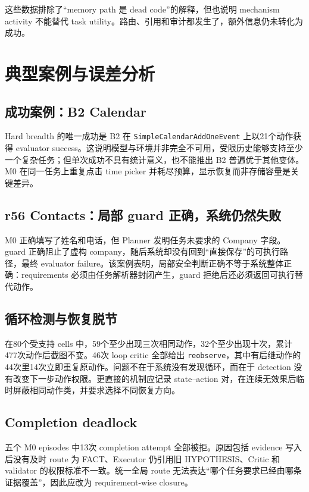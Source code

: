 \documentclass[12pt,a4paper]{ctexart}
\newcommand{\code}[1]{\texttt{#1}}
\begin{document}
这些数据排除了“memory path 是 dead code”的解释，但也说明 mechanism activity 不能替代 task utility。路由、引用和审计都发生了，额外信息仍未转化为成功。

\section{典型案例与误差分析}

\subsection{成功案例：B2 Calendar}

Hard breadth 的唯一成功是 B2 在 \code{SimpleCalendarAddOneEvent} 上以21个动作获得 evaluator success。这说明模型与环境并非完全不可用，受限历史能够支持至少一个复杂任务；但单次成功不具有统计意义，也不能推出 B2 普遍优于其他变体。M0 在同一任务上重复点击 time picker 并耗尽预算，显示恢复而非存储容量是关键差异。

\subsection{r56 Contacts：局部 guard 正确，系统仍然失败}

M0 正确填写了姓名和电话，但 Planner 发明任务未要求的 Company 字段。guard 正确阻止了虚构 company，随后系统却没有回到“直接保存”的可执行路径，最终 evaluator failure。该案例表明，局部安全判断正确不等于系统整体正确：requirements 必须由任务解析器封闭产生，guard 拒绝后还必须返回可执行替代动作。

\subsection{循环检测与恢复脱节}

在80个受支持 cells 中，59个至少出现三次相同动作，32个至少出现十次，累计477次动作后截图不变。46次 loop critic 全部给出 \code{reobserve}，其中有后继动作的44次里14次立即重复原动作。问题不在于系统没有发现循环，而在于 detection 没有改变下一步动作权限。更直接的机制应记录 state--action 对，在连续无效果后临时屏蔽相同动作类，并要求选择不同恢复方向。

\subsection{Completion deadlock}

五个 M0 episodes 中13次 completion attempt 全部被拒。原因包括 evidence 写入后没有及时 route 为 FACT、Executor 仍引用旧 HYPOTHESIS、Critic 和 validator 的权限标准不一致。统一全局 route 无法表达“哪个任务要求已经由哪条证据覆盖”，因此应改为 requirement-wise closure。
\end{document}
